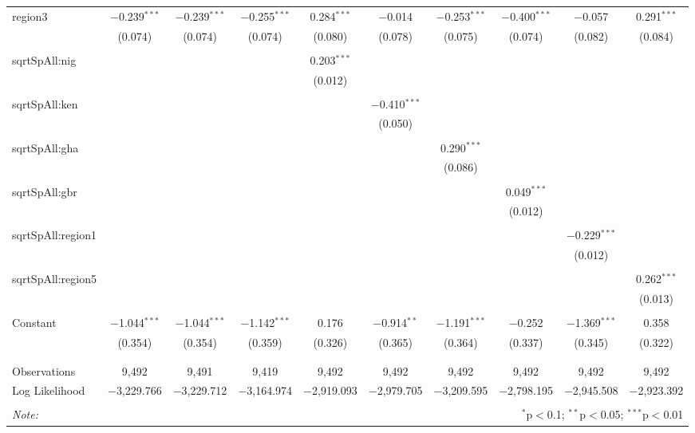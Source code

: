 \begin{table}[!htbp]
\begin{tabular}{@{\extracolsep{5pt}}lccccccccc}
 region3 & $-$0.239$^{***}$ & $-$0.239$^{***}$ & $-$0.255$^{***}$ & 0.284$^{***}$ & $-$0.014 & $-$0.253$^{***}$ & $-$0.400$^{***}$ & $-$0.057 & 0.291$^{***}$ \\ 
  & (0.074) & (0.074) & (0.074) & (0.080) & (0.078) & (0.075) & (0.074) & (0.082) & (0.084) \\ 
  & & & & & & & & & \\ 
 sqrtSpAll:nig &  &  &  & 0.203$^{***}$ &  &  &  &  &  \\ 
  &  &  &  & (0.012) &  &  &  &  &  \\ 
  & & & & & & & & & \\ 
 sqrtSpAll:ken &  &  &  &  & $-$0.410$^{***}$ &  &  &  &  \\ 
  &  &  &  &  & (0.050) &  &  &  &  \\ 
  & & & & & & & & & \\ 
 sqrtSpAll:gha &  &  &  &  &  & 0.290$^{***}$ &  &  &  \\ 
  &  &  &  &  &  & (0.086) &  &  &  \\ 
  & & & & & & & & & \\ 
 sqrtSpAll:gbr &  &  &  &  &  &  & 0.049$^{***}$ &  &  \\ 
  &  &  &  &  &  &  & (0.012) &  &  \\ 
  & & & & & & & & & \\ 
 sqrtSpAll:region1 &  &  &  &  &  &  &  & $-$0.229$^{***}$ &  \\ 
  &  &  &  &  &  &  &  & (0.012) &  \\ 
  & & & & & & & & & \\ 
 sqrtSpAll:region5 &  &  &  &  &  &  &  &  & 0.262$^{***}$ \\ 
  &  &  &  &  &  &  &  &  & (0.013) \\ 
  & & & & & & & & & \\ 
 Constant & $-$1.044$^{***}$ & $-$1.044$^{***}$ & $-$1.142$^{***}$ & 0.176 & $-$0.914$^{**}$ & $-$1.191$^{***}$ & $-$0.252 & $-$1.369$^{***}$ & 0.358 \\ 
  & (0.354) & (0.354) & (0.359) & (0.326) & (0.365) & (0.364) & (0.337) & (0.345) & (0.322) \\ 
  & & & & & & & & & \\ 
\hline \\[-1.8ex] 
Observations & 9,492 & 9,491 & 9,419 & 9,492 & 9,492 & 9,492 & 9,492 & 9,492 & 9,492 \\ 
Log Likelihood & $-$3,229.766 & $-$3,229.712 & $-$3,164.974 & $-$2,919.093 & $-$2,979.705 & $-$3,209.595 & $-$2,798.195 & $-$2,945.508 & $-$2,923.392 \\ 
\hline 
\hline \\[-1.8ex] 
\textit{Note:}  & \multicolumn{9}{r}{$^{*}$p$<$0.1; $^{**}$p$<$0.05; $^{***}$p$<$0.01} \\ 
\end{tabular} 
\end{table} 
